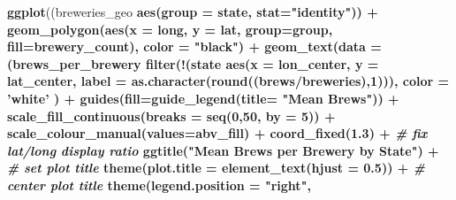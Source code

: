 \documentclass[]{article}
\newenvironment{Shaded}{\begin{snugshade}}{\end{snugshade}}
\newcommand{\KeywordTok}[1]{\textcolor[rgb]{0.13,0.29,0.53}{\textbf{#1}}}
\newcommand{\DataTypeTok}[1]{\textcolor[rgb]{0.13,0.29,0.53}{#1}}
\newcommand{\DecValTok}[1]{\textcolor[rgb]{0.00,0.00,0.81}{#1}}
\newcommand{\FloatTok}[1]{\textcolor[rgb]{0.00,0.00,0.81}{#1}}
\newcommand{\StringTok}[1]{\textcolor[rgb]{0.31,0.60,0.02}{#1}}
\newcommand{\CommentTok}[1]{\textcolor[rgb]{0.56,0.35,0.01}{\textit{#1}}}
\newcommand{\OperatorTok}[1]{\textcolor[rgb]{0.81,0.36,0.00}{\textbf{#1}}}
\newcommand{\NormalTok}[1]{#1}
\begin{document}
\begin{Shaded}
\begin{Highlighting}[]
{{{\KeywordTok{ggplot}\NormalTok{((breweries_geo }\OperatorTok{%
       \KeywordTok{aes}\NormalTok{(}\DataTypeTok{group =}\NormalTok{ state, }\DataTypeTok{stat=}\StringTok{"identity"}\NormalTok{)) }\OperatorTok{+}
\StringTok{  }\KeywordTok{geom_polygon}\NormalTok{(}\KeywordTok{aes}\NormalTok{(}\DataTypeTok{x =}\NormalTok{ long, }
                   \DataTypeTok{y =}\NormalTok{ lat, }
                   \DataTypeTok{group=}\NormalTok{group, }
                   \DataTypeTok{fill=}\NormalTok{brewery_count), }
               \DataTypeTok{color =} \StringTok{"black"}\NormalTok{) }\OperatorTok{+}\StringTok{ }
\StringTok{  }\KeywordTok{geom_text}\NormalTok{(}\DataTypeTok{data =}\NormalTok{ (brews_per_brewery }\OperatorTok{%
\StringTok{                    }\KeywordTok{filter}\NormalTok{(}\OperatorTok{!}\NormalTok{(state }\OperatorTok{%
            \KeywordTok{aes}\NormalTok{(}\DataTypeTok{x =}\NormalTok{ lon_center, }
                \DataTypeTok{y =}\NormalTok{ lat_center, }
                \DataTypeTok{label =} \KeywordTok{as.character}\NormalTok{(}\KeywordTok{round}\NormalTok{((brews}\OperatorTok{/}\NormalTok{breweries),}\DecValTok{1}\NormalTok{))),}
            \DataTypeTok{color =} \StringTok{'white'}
\NormalTok{            ) }\OperatorTok{+}
\StringTok{  }\KeywordTok{guides}\NormalTok{(}\DataTypeTok{fill=}\KeywordTok{guide_legend}\NormalTok{(}\DataTypeTok{title=} \StringTok{"Mean Brews"}\NormalTok{)) }\OperatorTok{+}
\StringTok{  }\KeywordTok{scale_fill_continuous}\NormalTok{(}\DataTypeTok{breaks =} \KeywordTok{seq}\NormalTok{(}\DecValTok{0}\NormalTok{,}\DecValTok{50}\NormalTok{, }\DataTypeTok{by =} \DecValTok{5}\NormalTok{)) }\OperatorTok{+}
\StringTok{  }\KeywordTok{scale_colour_manual}\NormalTok{(}\DataTypeTok{values=}\NormalTok{abv_fill) }\OperatorTok{+}
\StringTok{  }\KeywordTok{coord_fixed}\NormalTok{(}\FloatTok{1.3}\NormalTok{) }\OperatorTok{+}\StringTok{ }\CommentTok{# fix lat/long display ratio}
\StringTok{  }\KeywordTok{ggtitle}\NormalTok{(}\StringTok{"Mean Brews per Brewery by State"}\NormalTok{) }\OperatorTok{+}\StringTok{ }\CommentTok{# set plot title}
\StringTok{  }\KeywordTok{theme}\NormalTok{(}\DataTypeTok{plot.title =} \KeywordTok{element_text}\NormalTok{(}\DataTypeTok{hjust =} \FloatTok{0.5}\NormalTok{)) }\OperatorTok{+}\StringTok{ }\CommentTok{# center plot title}
\StringTok{  }\KeywordTok{theme}\NormalTok{(}\DataTypeTok{legend.position =} \StringTok{"right"}\NormalTok{,}
}}}}}}
\end{Highlighting}
\end{Shaded}
\end{document}
